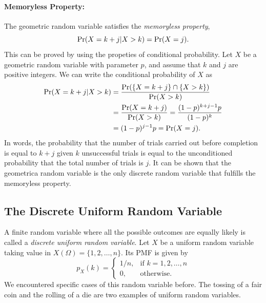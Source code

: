 \paragraph{Memoryless Property:}
The geometric random variable satisfies the \emph{memoryless property},
\begin{equation*}
\Pr (X = k + j | X > k) = \Pr (X = j).
\end{equation*}
This can be proved by using the propeties of conditional probability.
Let $X$ be a geometric random variable with parameter $p$, and assume that $k$ and $j$ are positive integers.
We can write the conditional probability of $X$ as
\begin{equation*}
\begin{split}
\Pr (X = k + j | X > k)
&= \frac{\Pr( \{ X =  k + j \} \cap \{ X > k \} ) }{ \Pr ( X > k ) } \\
&= \frac{\Pr( X = k + j ) }{ \Pr ( X > k ) }
= \frac{(1 - p)^{k + j - 1} p }{ (1 - p)^k  } \\
&= (1 - p)^{j - 1} p
= \Pr (X = j).
\end{split}
\end{equation*}
In words, the probability that the number of trials carried out before completion is equal to $k + j$ given $k$ unsuccessful trials is equal to the unconditioned probability that the total number of trials is $j$.
It can be shown that the geometrica random variable is the only discrete random variable that fulfills the memoryless property.


\subsection{The Discrete Uniform Random Variable}

A finite random variable where all the possible outcomes are equally likely is called a \emph{discrete uniform random variable}.
Let $X$ be a uniform random variable taking value in $X (\Omega) = \{ 1, 2, \ldots, n \}$.
Its PMF is given by
\begin{equation*}
p_X (k) = \left\{ \begin{array}{ll}
1/n, & \text{if }k = 1, 2, \ldots, n \\
0, & \text{otherwise} .
\end{array} \right.
\end{equation*}
We encountered specific cases of this random variable before.
The tossing of a fair coin and the rolling of a die are two examples of uniform random variables.

